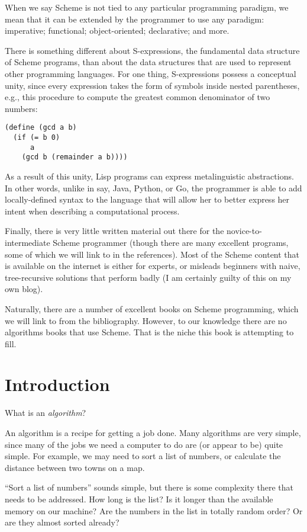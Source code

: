 \documentclass[12pt,openright,draft]{book}
\begin{document}
When we say Scheme is not tied to any particular programming paradigm,
we mean that it can be extended by the programmer to use any paradigm:
imperative; functional; object-oriented; declarative; and more.

There is something different about S-expressions, the fundamental data
structure of Scheme programs, than about the data structures that are
used to represent other programming languages.  For one thing,
S-expressions possess a conceptual unity, since every expression takes
the form of symbols inside nested parentheses, e.g., this procedure to
compute the greatest common denominator of two numbers:

\begin{verbatim}
(define (gcd a b)
  (if (= b 0)
      a
    (gcd b (remainder a b))))
\end{verbatim}

As a result of this unity, Lisp programs can express metalinguistic
abstractions.  In other words, unlike in say, Java, Python, or Go, the
programmer is able to add locally-defined syntax to the language that
will allow her to better express her intent when describing a
computational process.

Finally, there is very little written material out there for the
novice-to-intermediate Scheme programmer (though there are many
excellent programs, some of which we will link to in the references).
Most of the Scheme content that is available on the internet is either
for experts, or misleads beginners with naive, tree-recursive
solutions that perform badly (I am certainly guilty of this on my own
blog).

Naturally, there are a number of excellent books on Scheme
programming, which we will link to from the bibliography.  However, to
our knowledge there are no algorithms books that use Scheme.  That is
the niche this book is attempting to fill.

\chapter{Introduction}

What is an \emph{algorithm}?

An algorithm is a recipe for getting a job done.  Many algorithms are
very simple, since many of the jobs we need a computer to do are (or
appear to be) quite simple.  For example, we may need to sort a list
of numbers, or calculate the distance between two towns on a map.

``Sort a list of numbers'' sounds simple, but there is some complexity
there that needs to be addressed.  How long is the list?  Is it longer
than the available memory on our machine?  Are the numbers in the list
in totally random order?  Or are they almost sorted already?
\end{document}
